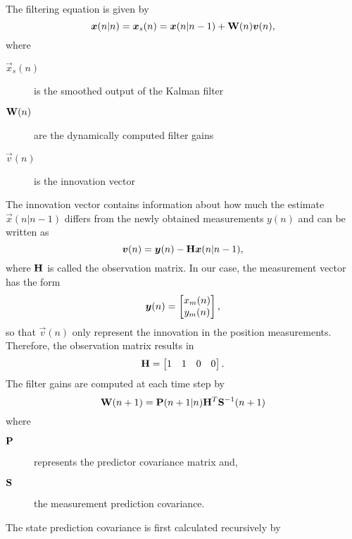 The filtering equation is given by
\begin{equation}
	\vec{x}(n|n) = \vec{x}_s(n) = \vec{x}(n|n-1) + \matrix{W}(n)\vec{v}(n)\\,
\end{equation}
where
\begin{description}
	\item[$\vec{x}_s(n)$] is the smoothed output of the Kalman filter
	\item[$\matrix{W}(n)$] are the dynamically computed filter gains
	\item[$\vec{v}(n)$] is the innovation vector 
\end{description}
The innovation vector contains information about how much the estimate $\vec{x}(n|n-1)$ differs from the newly obtained measurements $y(n)$ and can be written as
\begin{equation}
 \vec{v}(n) = \vec{y}(n) -\matrix{H} \vec{x}(n|n-1)\\,
\end{equation}
where $\matrix{H}$ is called the observation matrix. In our case, the measurement vector has the form 
\begin{equation}
\vec{y}(n) = \begin{bmatrix}
x_m(n) \\ y_m(n) \\ 
\end{bmatrix}\\,
\end{equation}
so that $\vec{v}(n)$ only represent the innovation in the position measurements. Therefore, the observation matrix results in 
\begin{equation}
	\matrix{H} = \begin{bmatrix}
	1 & 1 & 0 & 0 \\
	\end{bmatrix}\\.
\end{equation}
The filter gains are computed at each time step by 
\begin{equation}\label{eq:filtergain}
	\matrix{W}(n+1) = \matrix{P}(n+1|n)\matrix{H}^T\matrix{S}^{-1}(n+1)
\end{equation}
where
\begin{description}
	\item[$\matrix{P}$] represents the predictor covariance matrix and,
	\item[$\matrix{S}$] the measurement prediction covariance.
\end{description}
The state prediction covariance is first calculated recursively by 
